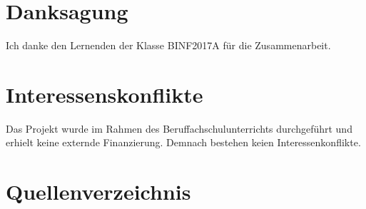 \documentclass[
  ngerman,
  a4paper,
  12pt]{scrartcl}
\begin{document}
\hypertarget{danksagung}{%
\section{Danksagung}\label{danksagung}}

Ich danke den Lernenden der Klasse BINF2017A für die Zusammenarbeit.

\hypertarget{interessenskonflikte}{%
\section{Interessenskonflikte}\label{interessenskonflikte}}

Das Projekt wurde im Rahmen des Beruffachschulunterrichts durchgeführt
und erhielt keine externde Finanzierung. Demnach bestehen keien
Interessenkonflikte.

\hypertarget{quellenverzeichnis}{%
\section*{Quellenverzeichnis}\label{quellenverzeichnis}}
\end{document}
